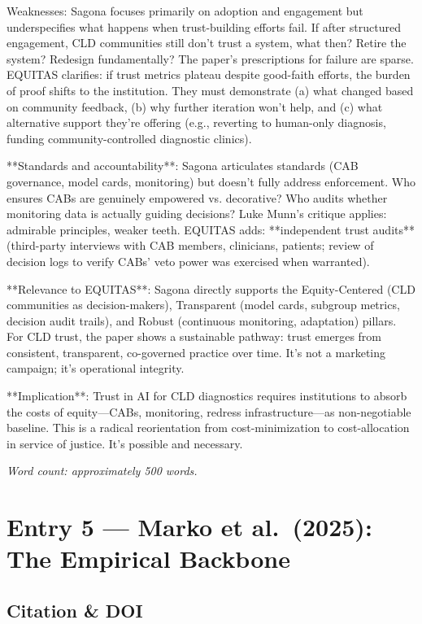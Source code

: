 \documentclass[12pt,twoside]{article}
\begin{document}
Weaknesses: Sagona focuses primarily on adoption and engagement but underspecifies what happens when trust-building efforts fail. If after structured engagement, CLD communities still don't trust a system, what then? Retire the system? Redesign fundamentally? The paper's prescriptions for failure are sparse. EQUITAS clarifies: if trust metrics plateau despite good-faith efforts, the burden of proof shifts to the institution. They must demonstrate (a) what changed based on community feedback, (b) why further iteration won't help, and (c) what alternative support they're offering (e.g., reverting to human-only diagnosis, funding community-controlled diagnostic clinics).

**Standards and accountability**: Sagona articulates standards (CAB governance, model cards, monitoring) but doesn't fully address enforcement. Who ensures CABs are genuinely empowered vs. decorative? Who audits whether monitoring data is actually guiding decisions? Luke Munn's critique applies: admirable principles, weaker teeth. EQUITAS adds: **independent trust audits** (third-party interviews with CAB members, clinicians, patients; review of decision logs to verify CABs' veto power was exercised when warranted).

**Relevance to EQUITAS**: Sagona directly supports the Equity-Centered (CLD communities as decision-makers), Transparent (model cards, subgroup metrics, decision audit trails), and Robust (continuous monitoring, adaptation) pillars. For CLD trust, the paper shows a sustainable pathway: trust emerges from consistent, transparent, co-governed practice over time. It's not a marketing campaign; it's operational integrity.

**Implication**: Trust in AI for CLD diagnostics requires institutions to absorb the costs of equity---CABs, monitoring, redress infrastructure---as non-negotiable baseline. This is a radical reorientation from cost-minimization to cost-allocation in service of justice. It's possible and necessary.

\emph{Word count: approximately 500 words.}

\newpage

\section*{Entry 5 --- Marko et al.\ (2025): The Empirical Backbone}

\subsection*{Citation \& DOI}
\end{document}
